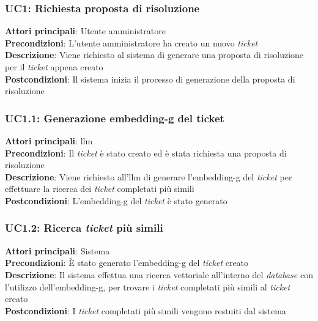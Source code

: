 \subsubsection{UC1: Richiesta proposta di risoluzione}
\textbf{Attori principali}: Utente amministratore \\
\textbf{Precondizioni}: L'utente amministratore ha creato un nuovo \textit{ticket} \\
\textbf{Descrizione}: Viene richiesto al sistema di generare una proposta di risoluzione per il \textit{ticket} appena creato \\
\textbf{Postcondizioni}: Il sistema inizia il processo di generazione della proposta di risoluzione \\

\subsubsection{UC1.1: Generazione \gls{embedding-g} del ticket}
\textbf{Attori principali}: \gls{llm} \\
\textbf{Precondizioni}: Il \textit{ticket} è stato creato ed è stata richiesta una proposta di risoluzione \\
\textbf{Descrizione}: Viene richiesto all'\gls{llm} di generare l'\gls{embedding-g} del \textit{ticket} per effettuare la ricerca dei \textit{ticket} completati più simili \\
\textbf{Postcondizioni}: L'\gls{embedding-g} del \textit{ticket} è stato generato \\

\subsubsection{UC1.2: Ricerca \textit{ticket} più simili}
\textbf{Attori principali}: Sistema \\ 
\textbf{Precondizioni}: È stato generato l'\gls{embedding-g} del \textit{ticket} creato\\
\textbf{Descrizione}: Il sistema effettua una ricerca vettoriale all'interno del \textit{database} con l'utilizzo dell'\gls{embedding-g}, per trovare i \textit{ticket} completati più simili al \textit{ticket} creato \\
\textbf{Postcondizioni}: I \textit{ticket} completati più simili vengono restuiti dal sistema \\

